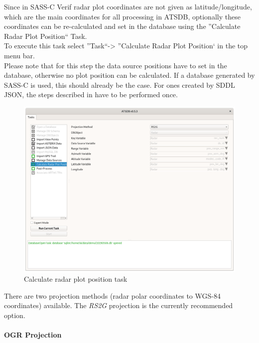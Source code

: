{Since in SASS-C Verif radar plot coordinates are not given as latitude/longitude, which are the main coordinates for all processing in ATSDB, optionally these coordinates can be re-calculated and set in the database using the ''Calculate Radar Plot Position`` Task. \\

To execute this task select ''Task``->  ''Calculate Radar Plot Position` in the top menu bar. \\

Please note that for this step the data source positions have to set in the database, otherwise no plot position can be calculated. If a database generated by SASS-C is used, this should already be the case. For ones created by SDDL JSON, the steps described in  have to be performed once.

\begin{figure}[H]
  \center
    \includegraphics[width=14cm,frame]{../screenshots/task_calc_radar.png}
  \caption{Calculate radar plot position task}
  \label{fig:task_calc_radar}
\end{figure}

There are two projection methods (radar polar coordinates to WGS-84 coordinates) available. The \textit{RS2G} projection is the currently recommended option.

\paragraph{OGR Projection}

}
